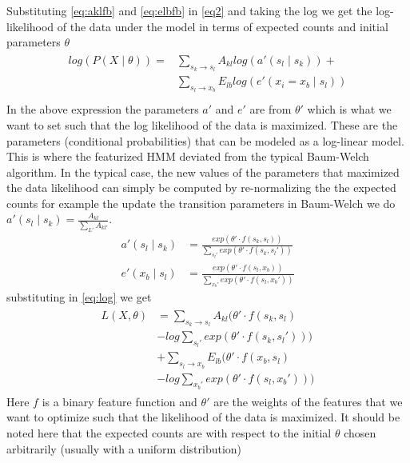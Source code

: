 \documentclass[11pt,letterpaper]{article}
\begin{document}
Substituting \eqref{eq:aklfb} and \eqref{eq:elbfb} in \eqref{eq2} and taking
the log we get the log-likelihood of the data under the model in terms of
expected counts and initial parameters $\theta$
\begin{align} \begin{split}
log(P(X\mid \theta)) =& \sum_{s_k \rightarrow s_l} A_{kl} log (a'(s_l \mid
s_k)) +\\
&  \sum_{s_l \rightarrow x_b} E_{lb} log( e'(x_i = x_b \mid s_l))
\label{eq:log}\\
\end{split} 
\end{align}
In the above expression the parameters $a'$ and $e'$ are from $\theta'$ which is
what we want to set such that the log likelihood of the data is maximized. These
are the parameters (conditional probabilities) that can be modeled as a
log-linear model. This is where the featurized HMM deviated from the typical
Baum-Welch algorithm. In the typical case, the new values of the parameters that
maximized the data likelihood can simply be computed by re-normalizing the the
expected counts for example the update the transition parameters in Baum-Welch
we do $a'(s_l \mid s_k) = \frac{A_{kl}} {\sum_{L'} A_{kl'}}$.
\begin{align}
a'(s_l \mid s_k) &= \frac{exp(\theta' \cdot f(s_k, s_l))}{\sum_{s_l'}
exp(\theta' \cdot f(s_k,s_l'))} \label{eq:probakl}\\
e'(x_b \mid s_l) &= \frac{exp(\theta' \cdot
f(s_l, x_b))}{\sum_{x_b'} exp(\theta' \cdot f(s_l, x_b'))} \label{eq:probelb}
\end{align}
substituting in \eqref{eq:log} we get
\begin{align}
\begin{split}
L(X,\theta) &= \sum_{s_k \rightarrow s_l} A_{kl} (\theta' \cdot f(s_k, s_l) \\ & -
log \sum_{s_l'} exp( \theta' \cdot f(s_k, s_l'))) \\ & + 
\sum_{s_l \rightarrow x_b} E_{lb} (\theta' \cdot f(x_b, s_l) \\ & - log\sum_{x_b'}
exp(\theta' \cdot f(s_l, x_b'))) \label{eq:logsub}
\end{split}
\end{align}
Here $f$ is a binary feature function and $\theta'$ are the weights of the
features that we want to optimize such that the likelihood of the data is
maximized. It should be noted here that the expected counts are with respect to
the initial $\theta$ chosen arbitrarily (usually with a uniform distribution)
\end{document}

